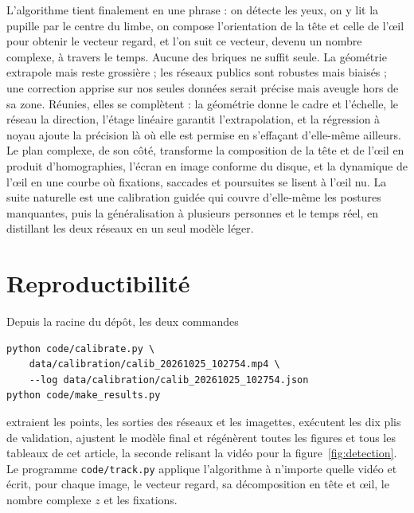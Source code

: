 \documentclass[10pt,a4paper]{article}
\begin{document}
L'algorithme tient finalement en une phrase : on détecte les yeux, on y lit la pupille par le centre du limbe, on compose l'orientation de la tête et celle de l'œil pour obtenir le vecteur regard, et l'on suit ce vecteur, devenu un nombre complexe, à travers le temps. Aucune des briques ne suffit seule. La géométrie extrapole mais reste grossière ; les réseaux publics sont robustes mais biaisés ; une correction apprise sur nos seules données serait précise mais aveugle hors de sa zone. Réunies, elles se complètent : la géométrie donne le cadre et l'échelle, le réseau la direction, l'étage linéaire garantit l'extrapolation, et la régression à noyau ajoute la précision là où elle est permise en s'effaçant d'elle-même ailleurs. Le plan complexe, de son côté, transforme la composition de la tête et de l'œil en produit d'homographies, l'écran en image conforme du disque, et la dynamique de l'œil en une courbe où fixations, saccades et poursuites se lisent à l'œil nu. La suite naturelle est une calibration guidée qui couvre d'elle-même les postures manquantes, puis la généralisation à plusieurs personnes et le temps réel, en distillant les deux réseaux en un seul modèle léger.

\section*{Reproductibilité}

Depuis la racine du dépôt, les deux commandes
\begin{verbatim}
python code/calibrate.py \
    data/calibration/calib_20261025_102754.mp4 \
    --log data/calibration/calib_20261025_102754.json
python code/make_results.py
\end{verbatim}
extraient les points, les sorties des réseaux et les imagettes, exécutent les dix plis de validation, ajustent le modèle final et régénèrent toutes les figures et tous les tableaux de cet article, la seconde relisant la vidéo pour la figure~\ref{fig:detection}. Le programme \texttt{code/track.py} applique l'algorithme à n'importe quelle vidéo et écrit, pour chaque image, le vecteur regard, sa décomposition en tête et œil, le nombre complexe $z$ et les fixations.
\end{document}
